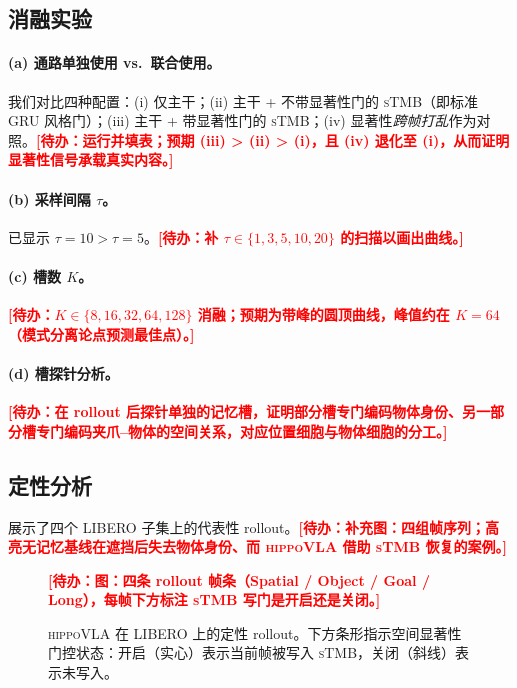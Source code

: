 \documentclass[10pt,letterpaper,fontset=fandol]{ctexart}
\newcommand{\todo}[1]{\textcolor{red}{\textbf{[待办：#1]}}}
\newcommand{\method}{\textsc{hippoVLA}\xspace}
\newcommand{\sTMB}{\textsc{sTMB}\xspace}
\begin{document}
\subsection{消融实验}
\label{sec:exp-ablation}

\paragraph{(a) 通路单独使用 vs.\ 联合使用。} 我们对比四种配置：(i) 仅主干；(ii) 主干 + 不带显著性门的 \sTMB（即标准 GRU 风格门）；(iii) 主干 + 带显著性门的 \sTMB；(iv) 显著性\emph{跨帧打乱}作为对照。\todo{运行并填表；预期 (iii) > (ii) > (i)，且 (iv) 退化至 (i)，从而证明显著性信号承载真实内容。}

\paragraph{(b) 采样间隔 $\tau$。}  已显示 $\tau=10 > \tau=5$。\todo{补 $\tau \in \{1, 3, 5, 10, 20\}$ 的扫描以画出曲线。}

\paragraph{(c) 槽数 $K$。} \todo{$K \in \{8, 16, 32, 64, 128\}$ 消融；预期为带峰的圆顶曲线，峰值约在 $K=64$（模式分离论点预测最佳点）。}

\paragraph{(d) 槽探针分析。} \todo{在 rollout 后探针单独的记忆槽，证明部分槽专门编码物体身份、另一部分槽专门编码夹爪--物体的空间关系，对应位置细胞与物体细胞的分工。}

\subsection{定性分析}
 展示了四个 LIBERO 子集上的代表性 rollout。\todo{补充图：四组帧序列；高亮无记忆基线在遮挡后失去物体身份、而 \method 借助 \sTMB 恢复的案例。}

\begin{figure}[t]
\centering
\todo{图：四条 rollout 帧条（Spatial / Object / Goal / Long），每帧下方标注 \sTMB 写门是开启还是关闭。}
\caption{\method 在 LIBERO 上的定性 rollout。下方条形指示空间显著性门控状态：开启（实心）表示当前帧被写入 \sTMB，关闭（斜线）表示未写入。}
\label{fig:rollouts}
\end{figure}
\end{document}
